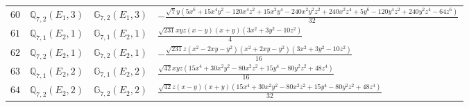 \documentclass[fleqn,8pt,landscape]{jsarticle}
\begin{document}
\begin{table}[ht!]
\begin{center}
\begin{tabular}{cccl}
$ 60 $ & $ \mathbb{Q}_{7,2}(E_{1},3) $ & $ \mathbb{G}_{7,2}(E_{1},3) $ & $ - \frac{\sqrt{7} y \left(5 x^{6} + 15 x^{4} y^{2} - 120 x^{4} z^{2} + 15 x^{2} y^{4} - 240 x^{2} y^{2} z^{2} + 240 x^{2} z^{4} + 5 y^{6} - 120 y^{4} z^{2} + 240 y^{2} z^{4} - 64 z^{6}\right)}{32} $ \\
$ 61 $ & $ \mathbb{Q}_{7,1}(E_{2},1) $ & $ \mathbb{G}_{7,1}(E_{2},1) $ & $ \frac{\sqrt{231} x y z \left(x - y\right) \left(x + y\right) \left(3 x^{2} + 3 y^{2} - 10 z^{2}\right)}{4} $ \\
$ 62 $ & $ \mathbb{Q}_{7,2}(E_{2},1) $ & $ \mathbb{G}_{7,2}(E_{2},1) $ & $ - \frac{\sqrt{231} z \left(x^{2} - 2 x y - y^{2}\right) \left(x^{2} + 2 x y - y^{2}\right) \left(3 x^{2} + 3 y^{2} - 10 z^{2}\right)}{16} $ \\
$ 63 $ & $ \mathbb{Q}_{7,1}(E_{2},2) $ & $ \mathbb{G}_{7,1}(E_{2},2) $ & $ \frac{\sqrt{42} x y z \left(15 x^{4} + 30 x^{2} y^{2} - 80 x^{2} z^{2} + 15 y^{4} - 80 y^{2} z^{2} + 48 z^{4}\right)}{16} $ \\
$ 64 $ & $ \mathbb{Q}_{7,2}(E_{2},2) $ & $ \mathbb{G}_{7,2}(E_{2},2) $ & $ \frac{\sqrt{42} z \left(x - y\right) \left(x + y\right) \left(15 x^{4} + 30 x^{2} y^{2} - 80 x^{2} z^{2} + 15 y^{4} - 80 y^{2} z^{2} + 48 z^{4}\right)}{32} $ \\
 \hline \hline
\end{tabular}
\end{center}
\end{table}
\end{document}
